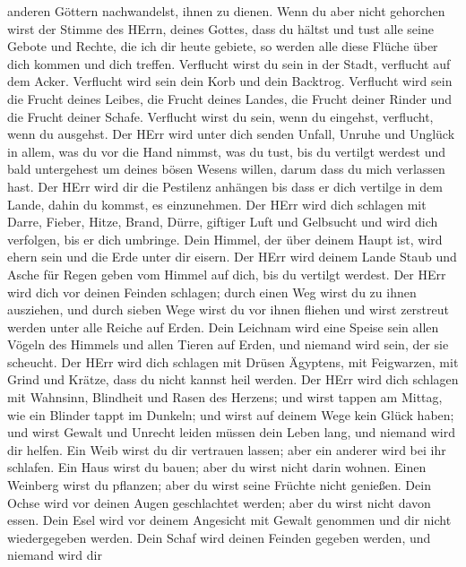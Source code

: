 anderen Göttern nachwandelst, ihnen zu dienen.  Wenn du
aber nicht gehorchen wirst der Stimme des HErrn, deines Gottes, dass du
hältst und tust alle seine Gebote und Rechte, die ich dir heute gebiete,
so werden alle diese Flüche über dich kommen und dich treffen.
 Verflucht wirst du sein in der Stadt, verflucht auf dem
Acker.  Verflucht wird sein dein Korb und dein Backtrog.
 Verflucht wird sein die Frucht deines Leibes, die Frucht
deines Landes, die Frucht deiner Rinder und die Frucht deiner Schafe.
 Verflucht wirst du sein, wenn du eingehst, verflucht, wenn
du ausgehst.  Der HErr wird unter dich senden Unfall,
Unruhe und Unglück in allem, was du vor die Hand nimmst, was du tust,
bis du vertilgt werdest und bald untergehest um deines bösen Wesens
willen, darum dass du mich verlassen hast.  Der HErr wird
dir die Pestilenz anhängen bis dass er dich vertilge in dem Lande, dahin
du kommst, es einzunehmen.  Der HErr wird dich schlagen mit
Darre, Fieber, Hitze, Brand, Dürre, giftiger Luft und Gelbsucht und wird
dich verfolgen, bis er dich umbringe.  Dein Himmel, der
über deinem Haupt ist, wird ehern sein und die Erde unter dir eisern.
 Der HErr wird deinem Lande Staub und Asche für Regen geben
vom Himmel auf dich, bis du vertilgt werdest.  Der HErr
wird dich vor deinen Feinden schlagen; durch einen Weg wirst du zu ihnen
ausziehen, und durch sieben Wege wirst du vor ihnen fliehen und wirst
zerstreut werden unter alle Reiche auf Erden.  Dein
Leichnam wird eine Speise sein allen Vögeln des Himmels und allen Tieren
auf Erden, und niemand wird sein, der sie scheucht.  Der
HErr wird dich schlagen mit Drüsen Ägyptens, mit Feigwarzen, mit Grind
und Krätze, dass du nicht kannst heil werden.  Der HErr
wird dich schlagen mit Wahnsinn, Blindheit und Rasen des Herzens;
 und wirst tappen am Mittag, wie ein Blinder tappt im
Dunkeln; und wirst auf deinem Wege kein Glück haben; und wirst Gewalt
und Unrecht leiden müssen dein Leben lang, und niemand wird dir helfen.
 Ein Weib wirst du dir vertrauen lassen; aber ein anderer
wird bei ihr schlafen. Ein Haus wirst du bauen; aber du wirst nicht
darin wohnen. Einen Weinberg wirst du pflanzen; aber du wirst seine
Früchte nicht genießen.  Dein Ochse wird vor deinen Augen
geschlachtet werden; aber du wirst nicht davon essen. Dein Esel wird vor
deinem Angesicht mit Gewalt genommen und dir nicht wiedergegeben werden.
Dein Schaf wird deinen Feinden gegeben werden, und niemand wird dir
